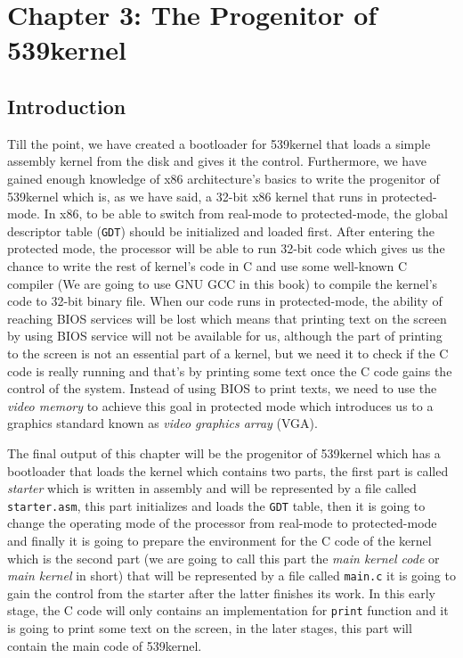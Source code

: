 \chapter{Chapter 3: The Progenitor of 539kernel}\label{ch-progenitor}

\section{Introduction}\label{introduction}

Till the point, we have created a bootloader for 539kernel that loads a
simple assembly kernel from the disk and gives it the control.
Furthermore, we have gained enough knowledge of x86 architecture's
basics to write the progenitor of 539kernel which is, as we have said, a
32-bit x86 kernel that runs in protected-mode. In x86, to be able to
switch from real-mode to protected-mode, the global descriptor table
(\lstinline!GDT!) should be initialized and loaded first. After entering
the protected mode, the processor will be able to run 32-bit code which
gives us the chance to write the rest of kernel's code in C and use some
well-known C compiler (We are going to use GNU GCC in this book) to
compile the kernel's code to 32-bit binary file. When our code runs in
protected-mode, the ability of reaching BIOS services will be lost which
means that printing text on the screen by using BIOS service will not be
available for us, although the part of printing to the screen is not an
essential part of a kernel, but we need it to check if the C code is
really running and that's by printing some text once the C code gains
the control of the system. Instead of using BIOS to print texts, we need
to use the \emph{video memory} to achieve this goal in protected mode
which introduces us to a graphics standard known as \emph{video graphics
array} (VGA).

The final output of this chapter will be the progenitor of 539kernel
which has a bootloader that loads the kernel which contains two parts,
the first part is called \emph{starter} which is written in assembly and
will be represented by a file called \lstinline!starter.asm!, this part
initializes and loads the \lstinline!GDT! table, then it is going to
change the operating mode of the processor from real-mode to
protected-mode and finally it is going to prepare the environment for
the C code of the kernel which is the second part (we are going to call
this part the \emph{main kernel code} or \emph{main kernel} in short)
that will be represented by a file called \lstinline!main.c! it is going
to gain the control from the starter after the latter finishes its work.
In this early stage, the C code will only contains an implementation for
\lstinline!print! function and it is going to print some text on the
screen, in the later stages, this part will contain the main code of
539kernel.

